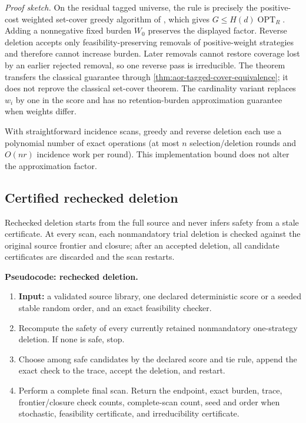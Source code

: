 \noindent\emph{Proof sketch.}
On the residual tagged universe, the rule is precisely the positive-cost
weighted set-cover greedy algorithm of \citet{Chvatal1979}, which gives
\(G\leq H(d)\operatorname{OPT}_R\).  Adding a nonnegative fixed burden
\(W_0\) preserves the displayed factor.  Reverse deletion accepts only
feasibility-preserving removals of positive-weight strategies and therefore
cannot increase burden.  Later removals cannot restore coverage lost by an
earlier rejected removal, so one reverse pass is irreducible.  The theorem
transfers the classical guarantee through
\cref{thm:aor-tagged-cover-equivalence}; it does not reprove the classical
set-cover theorem.  The cardinality variant replaces \(w_i\) by one in the
score and has no retention-burden approximation guarantee when weights differ.

With straightforward incidence scans, greedy and reverse deletion each use a
polynomial number of exact operations (at most \(n\) selection/deletion rounds
and \(O(nr)\) incidence work per round).  This implementation bound does not
alter the approximation factor.

\subsection{Certified rechecked deletion}
\label{subsec:aor-certified-deletion-suite}

Rechecked deletion starts from the full source and never infers safety from a
stale certificate.  At every scan, each nonmandatory trial deletion is checked
against the original source frontier and closure; after an accepted deletion,
all candidate certificates are discarded and the scan restarts.

\noindent\textbf{Pseudocode: rechecked deletion.}
\begin{enumerate}
 \item \textbf{Input:} a validated source library, one declared deterministic
       score or a seeded stable random order, and an exact feasibility checker.
 \item Recompute the safety of every currently retained nonmandatory
       one-strategy deletion.  If none is safe, stop.
 \item Choose among safe candidates by the declared score and tie rule, append
       the exact check to the trace, accept the deletion, and restart.
 \item Perform a complete final scan.  Return the endpoint, exact burden,
       trace, frontier/closure check counts, complete-scan count, seed and
       order when stochastic, feasibility certificate, and irreducibility
       certificate.
\end{enumerate}

